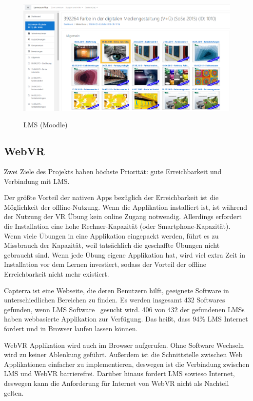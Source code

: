 \begin{figure}[ht]
\vspace*{1em}
\centering
\caption{LMS (Moodle)}
\includegraphics[width=\textwidth]{images/moodleBeispiel.png}
\label{fig:moodleBeispiel} 
\end{figure}

 \subsection{WebVR}
 Zwei Ziele des Projekts haben höchste Priorität: gute Erreichbarkeit und Verbindung mit LMS.

 Der größte Vorteil der nativen Apps bezüglich der Erreichbarkeit ist die Möglichkeit der offline-Nutzung. Wenn die Applikation installiert ist, ist während der Nutzung der VR Übung kein online Zugang notwendig. Allerdings erfordert die Installation eine hohe Rechner-Kapazität (oder Smartphone-Kapazität). Wenn viele Übungen in eine Applikation eingepackt werden, führt es zu Missbrauch der Kapazität, weil tatsächlich die geschaffte Übungen nicht gebraucht sind. Wenn jede Übung eigene Applikation hat, wird viel extra Zeit in Installation vor dem Lernen investiert, sodass der Vorteil der offline Erreichbarkeit nicht mehr existiert.

 Capterra ist eine Webseite, die deren Benutzern hilft, geeignete Software in unterschiedlichen Bereichen zu finden. Es werden insgesamt 432 Softwares gefunden, wenn \glqq LMS Software \grqq\ gesucht wird. 406 von 432 der gefundenen LMSs haben webbasierte Applikation zur Verfügung. Das heißt, dass 94\% LMS Internet fordert und in Browser laufen lassen können.

 WebVR Applikation wird auch im Browser aufgerufen. Ohne Software Wechseln wird zu keiner Ablenkung geführt. Außerdem ist die Schnittstelle zwischen Web Applikationen einfacher zu implementieren, deswegen ist die Verbindung zwischen LMS und WebVR barrierefrei. Darüber hinaus fordert LMS sowieso Internet, deswegen kann die Anforderung für Internet von WebVR nicht als Nachteil gelten. 

